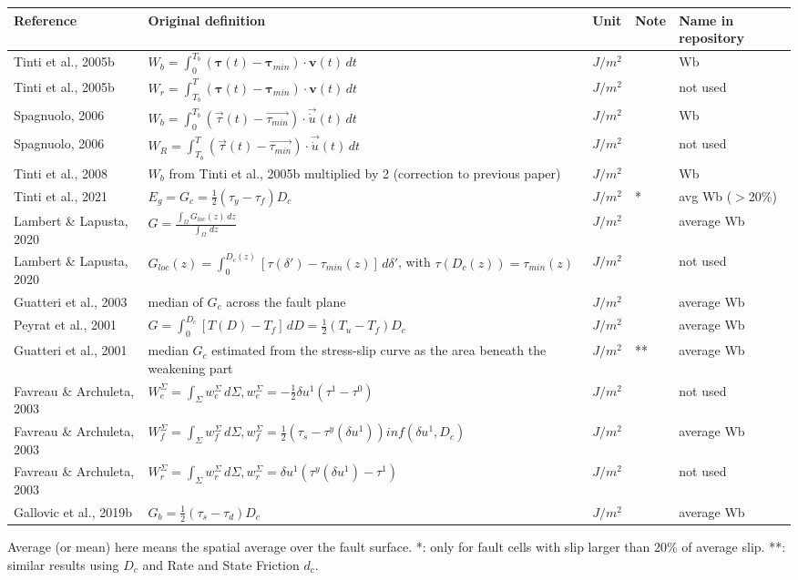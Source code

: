 \documentclass{article}
\begin{document}
\begin{longtable}{|p{4 cm}|p{8 cm}|p{1.25 cm}|p{1.25 cm}|p{1.5 cm}|}
\hline
\textbf{Reference} & \textbf{Original definition} & \textbf{Unit} & \textbf{Note} & \textbf{Name in repository} \\ \hline
Tinti et al., 2005b & \( \displaystyle W_b = \int_{0}^{T_b} (\bm{\tau}(t)-\bm{\tau}_{min})\cdot \bm{v}(t)\,dt \) & $J/m^2$ & & Wb \\
Tinti et al., 2005b & \( \displaystyle W_r = \int_{T_b}^{T} (\bm{\tau}(t)-\bm{\tau}_{min})\cdot \bm{v}(t)\,dt \) & $J/m^2$ & & not used \\
Spagnuolo, 2006 & \( \displaystyle W_b = \int_{0}^{T_b} (\vec{\tau}(t)-\vec{\tau_{min}})\cdot \vec{\dot{u}}(t)\,dt \) & $J/m^2$ & & Wb \\
Spagnuolo, 2006 & \( \displaystyle W_R = \int_{T_b}^{T} (\vec{\tau}(t)-\vec{\tau_{min}})\cdot \vec{\dot{u}}(t)\,dt \) & $J/m^2$ & & not used \\
Tinti et al., 2008 & $W_b$ from Tinti et al., 2005b multiplied by 2 (correction to previous paper) & $J/m^2$ & & Wb \\
Tinti et al., 2021 & \(\displaystyle E_g = G_c = \frac{1}{2} (\tau_y-\tau_f) D_c\) & $J/m^2$ & * & avg Wb ($>$20\%) \\
Lambert \& Lapusta, 2020 & \( \displaystyle G = \frac{\int_{\Omega} G_{loc}(z) \,dz}{\int_{\Omega}\,dz} \) & $J/m^2$ & & average Wb \\
Lambert \& Lapusta, 2020 & \( \displaystyle G_{loc}(z) = \int_{0}^{D_c (z)} [\tau(\delta')-\tau_{min}(z)]\,d\delta' \), with $\tau(D_c(z)) = \tau_{min}(z)$ & $J/m^2$ & & not used \\
Guatteri et al., 2003 & median of $G_c$ across the fault plane & $J/m^2$ & & average Wb \\
Peyrat et al., 2001 & \( \displaystyle G=\int_{0}^{D_c} [T(D)-T_f]\,dD = \frac{1}{2}(T_u-T_f)D_c \) & $J/m^2$ & & average Wb \\
Guatteri et al., 2001 & median $G_c$ estimated from the stress-slip curve as the area beneath the weakening part & $J/m^2$ & ** & average Wb \\
Favreau \& Archuleta, 2003 & \( \displaystyle W_e^\Sigma = \int_{\Sigma} w_e^\Sigma\,d\Sigma, w_e^\Sigma = -\frac{1}{2} \delta u^1 (\tau^1-\tau^0) \) & $J/m^2$ & & not used \\
Favreau \& Archuleta, 2003 & \( \displaystyle W_f^\Sigma = \int_{\Sigma} w_f^\Sigma\,d\Sigma, w_f^\Sigma = \frac{1}{2} (\tau_s-\tau^y(\delta u^1)) inf(\delta u^1, D_c) \) & $J/m^2$ & & average Wb \\
Favreau \& Archuleta, 2003 & \( \displaystyle W_r^\Sigma = \int_{\Sigma} w_r^\Sigma\,d\Sigma, w_r^\Sigma = \delta u^1 (\tau^y (\delta u^1)-\tau^1) \) & $J/m^2$ & & not used \\
Gallovic et al., 2019b & \( \displaystyle G_b =\frac{1}{2}(\tau_s-\tau_d)D_c  \) & $J/m^2$ & & average Wb \\
\hline
\end{longtable}
Average (or mean) here means the spatial average over the fault surface. *: only for fault cells with slip larger than 20\% of average slip. **: similar results using $D_c$ and Rate and State Friction $d_c$.
\end{document}
